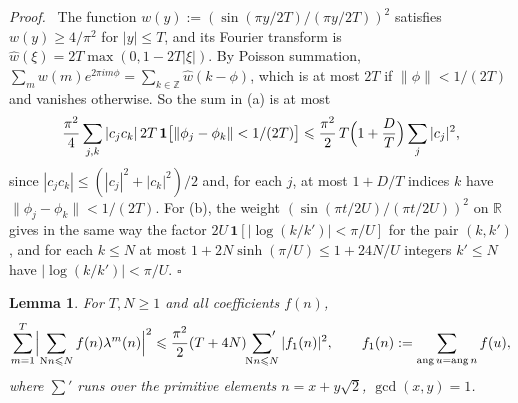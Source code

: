 \documentclass{article}
\numberwithin{equation}{section}
\newtheorem{lemma}{Lemma}
\newenvironment{proof}[1][Proof]{\par\medskip\noindent\textit{#1.}\ }{\hfill$\square$\par\medskip}
\newcommand{\Le}{\leqslant}
\newcommand{\Ge}{\geqslant}
\begin{document}
\begin{proof}
The function $w(y) := (\sin(\pi y/2T)/(\pi y/2T))^2$ satisfies $w(y) \Ge 4/\pi^2$ for $|y| \Le T$, and its Fourier transform is $\hat w(\xi) = 2T \max(0, 1 - 2T|\xi|)$. By Poisson summation, $\sum_{m} w(m) e^{2\pi i m \phi} = \sum_{k \in \mathbb{Z}} \hat w(k - \phi)$, which is at most $2T$ if $\|\phi\| < 1/(2T)$ and vanishes otherwise. So the sum in (a) is at most
\begin{equation*}
\frac{\pi^2}{4} \sum_{j, k} |c_j c_k|\, 2T\, \mathbf{1}\bigl[ \|\phi_j - \phi_k\| < 1/(2T) \bigr] \Le \frac{\pi^2}{2}\, T \Bigl( 1 + \frac{D}{T} \Bigr) \sum_{j} |c_j|^2,
\end{equation*}
since $|c_j c_k| \Le (|c_j|^2 + |c_k|^2)/2$ and, for each $j$, at most $1 + D/T$ indices $k$ have $\|\phi_j - \phi_k\| < 1/(2T)$. For (b), the weight $(\sin(\pi t/2U)/(\pi t/2U))^2$ on $\mathbb{R}$ gives in the same way the factor $2U\, \mathbf{1}[|\log(k/k')| < \pi/U]$ for the pair $(k, k')$, and for each $k \Le N$ at most $1 + 2N\sinh(\pi/U) \Le 1 + 24N/U$ integers $k' \Le N$ have $|\log(k/k')| < \pi/U$.
\end{proof}

\begin{lemma}
\label{lem: sqrt2 mean value}
For $T, N \Ge 1$ and all coefficients $f(n)$,
\begin{equation*}
\sum_{m = 1}^{T} \Bigl| \sum_{\mathrm{N}n \Le N} f(n) \lambda^m(n) \Bigr|^2 \Le \frac{\pi^2}{2} (T + 4N) \sideset{}{'}\sum_{\mathrm{N}n \Le N} |f_1(n)|^2, \qquad f_1(n) := \sum_{\operatorname{ang} u = \operatorname{ang} n} f(u),
\end{equation*}
where $\sum'$ runs over the primitive elements $n = x + y\sqrt{2}$, $\gcd(x, y) = 1$.
\end{lemma}
\end{document}
